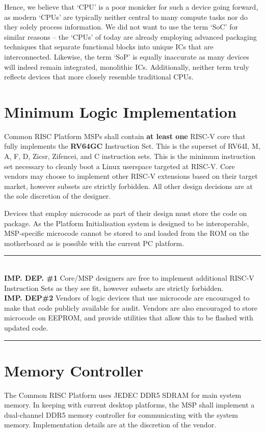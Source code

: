 \documentclass[12pt]{report}
\begin{document}
Hence, we believe that `CPU' is a poor monicker for such a device going forward, as modern `CPUs' are typically neither
central to many compute tasks nor do they solely process information. We did not want to use the term `SoC' for similar
reasons -- the `CPUs' of today are already employing advanced packaging techniques that separate functional blocks into
unique ICs that are interconnected. Likewise, the term `SoP' is equally inaccurate as many devices will indeed remain
integrated, monolithic ICs. Additionally, neither term truly reflects devices that more closely resemble traditional CPUs.

\section{Minimum Logic Implementation}
Common RISC Platform MSPs shall contain \textbf{at least one} RISC-V core that fully implements the \textbf{RV64GC} Instruction
Set. This is the superset of RV64I, M, A, F, D, Zicsr, Zifencei, and C instruction sets. This is the minimum instruction
set necessary to cleanly boot a Linux userspace targeted at RISC-V. Core vendors may choose to implement other RISC-V
extensions based on their target market, however subsets are strictly forbidden. All other design decisions are at the
sole discretion of the designer.

Devices that employ microcode as part of their design must store the code on package. As the Platform Initialisation
system is designed to be interoperable, MSP-specific microcode cannot be stored to and loaded from the ROM on the
motherboard as is possible with the current PC platform.

\rule{16cm}{0.4pt}\\
\small
\textbf{IMP. DEP. \#1\:}
Core/MSP designers are free to implement additional RISC-V Instruction Sets as they see fit, however subsets are
strictly forbidden.\\
\textbf{IMP. DEP\#2\:}
Vendors of logic devices that use microcode are encouraged to make that code publicly available for audit. Vendors are
also encouraged to store microcode on EEPROM, and provide utilities that allow this to be flashed with updated code.\\
\normalsize
\rule{16cm}{0.4pt}
\newpage

\section{Memory Controller}
The Common RISC Platform uses JEDEC DDR5 SDRAM for main system memory. In keeping with current desktop platforms, the MSP
shall implement a dual-channel DDR5 memory controller for communicating with the system memory. Implementation details
are at the discretion of the vendor.
\end{document}
